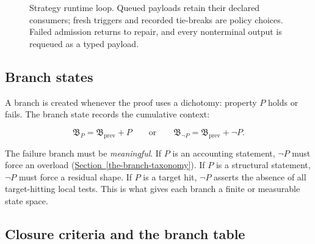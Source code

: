 \documentclass[
  11pt,
]{article}
\theoremstyle{definition}
\newcommand{\secref}[1]{\hyperref[#1]{Section~\ref*{#1}}}
\begin{document}
\begin{figure}[htbp]
{%
}
\caption[Strategy runtime loop]{Strategy runtime loop.  Queued payloads retain their declared consumers; fresh triggers and recorded tie-breaks are policy choices.  Failed admission returns to repair, and every nonterminal output is requeued as a typed payload.}
\label{fig:strategy-runtime-loop}
\end{figure}

\subsection{Branch states}\label{branch-states}

A branch is created whenever the proof uses a dichotomy: property \(P\)
holds or fails. The branch state records the cumulative context:

\[
\mathfrak B_P = \mathfrak B_{\mathrm{prev}} + P
\qquad\text{or}\qquad
\mathfrak B_{\neg P} = \mathfrak B_{\mathrm{prev}} + \neg P.
\]

The failure branch must be \emph{meaningful}. If \(P\) is an accounting
statement, \(\neg P\) must force an overload (\secref{the-branch-taxonomy}). If \(P\) is a
structural statement, \(\neg P\) must force a residual shape. If \(P\)
is a target hit, \(\neg P\) asserts the absence of all target-hitting
local tests. This is what gives each branch a finite or measurable state
space.

\subsection{Closure criteria and the branch
table}\label{closure-criteria-and-the-branch-table}
\end{document}
